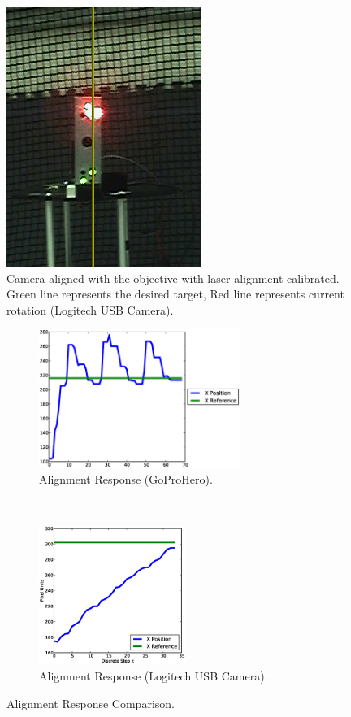 \documentclass[botnum, fleqn]{unmeethesis}
\begin{document}
\begin{figure}[ht]
 \begin{center}
  \includegraphics[width=0.5 \textwidth]{figures/postcalibration.png}
  \caption{\small \label{fig:postcalibration} Camera aligned with the objective with laser alignment calibrated. Green line represents the desired target, Red line represents current rotation (Logitech USB Camera).}
 \end{center}
\end{figure}

\begin{figure}
  \begin{center}
    \begin{subfigure}{0.49\textwidth}
        \centering 
        \includegraphics[height=45mm]{figures/old_xpos_xref.eps}
        \caption{\scriptsize Alignment Response (GoProHero).}
    \end{subfigure}\\
    \begin{subfigure}{0.49\textwidth}
        \centering 
        \includegraphics[height=45mm]{figures/alignmentTest.eps}
        \caption{\scriptsize Alignment Response (Logitech USB Camera).}
    \end{subfigure}
    \caption{\small Alignment Response Comparison.}
  \end{center}
\end{figure}
\end{document}
